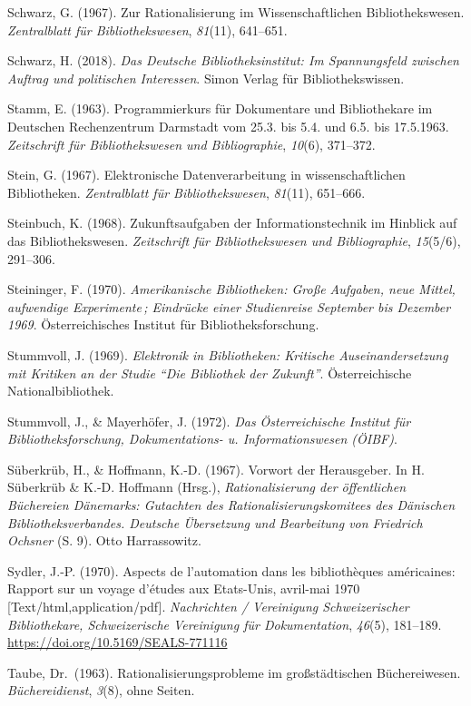 \documentclass[a4paper,
fontsize=11pt,
oneside,
numbers=noperiodatend,
parskip=half-,
bibliography=totoc,
final
]{scrartcl}
\begin{document}
Schwarz, G. (1967). Zur Rationalisierung im Wissenschaftlichen
Bibliothekswesen. \emph{Zentralblatt für Bibliothekswesen},
\emph{81}(11), 641--651.

Schwarz, H. (2018). \emph{Das Deutsche Bibliotheksinstitut: Im
Spannungsfeld zwischen Auftrag und politischen Interessen}. Simon Verlag
für Bibliothekswissen.

Stamm, E. (1963). Programmierkurs für Dokumentare und Bibliothekare im
Deutschen Rechenzentrum Darmstadt vom 25.3. bis 5.4. und 6.5. bis
17.5.1963. \emph{Zeitschrift für Bibliothekswesen und Bibliographie},
\emph{10}(6), 371--372.

Stein, G. (1967). Elektronische Datenverarbeitung in wissenschaftlichen
Bibliotheken. \emph{Zentralblatt für Bibliothekswesen}, \emph{81}(11),
651--666.

Steinbuch, K. (1968). Zukunftsaufgaben der Informationstechnik im
Hinblick auf das Bibliothekswesen. \emph{Zeitschrift für
Bibliothekswesen und Bibliographie}, \emph{15}(5/6), 291--306.

Steininger, F. (1970). \emph{Amerikanische Bibliotheken: Große Aufgaben,
neue Mittel, aufwendige Experimente\,; Eindrücke einer Studienreise
September bis Dezember 1969}. Österreichisches Institut für
Bibliotheksforschung.

Stummvoll, J. (1969). \emph{Elektronik in Bibliotheken: Kritische
Auseinandersetzung mit Kritiken an der Studie \enquote{Die Bibliothek der
Zukunft}}. Österreichische Nationalbibliothek.

Stummvoll, J., \& Mayerhöfer, J. (1972). \emph{Das Österreichische
Institut für Bibliotheksforschung, Dokumentations- u. Informationswesen
(ÖIBF)}.

Süberkrüb, H., \& Hoffmann, K.-D. (1967). Vorwort der Herausgeber. In H.
Süberkrüb \& K.-D. Hoffmann (Hrsg.), \emph{Rationalisierung der
öffentlichen Büchereien Dänemarks: Gutachten des
Rationalisierungskomitees des Dänischen Bibliotheksverbandes. Deutsche
Übersetzung und Bearbeitung von Friedrich Ochsner} (S. 9). Otto
Harrassowitz.

Sydler, J.-P. (1970). Aspects de l'automation dans les bibliothèques
américaines: Rapport sur un voyage d'études aux Etats-Unis, avril-mai
1970 {[}Text/html,application/pdf{]}. \emph{Nachrichten / Vereinigung
Schweizerischer Bibliothekare, Schweizerische Vereinigung für
Dokumentation}, \emph{46}(5), 181--189.
\url{https://doi.org/10.5169/SEALS-771116}

Taube, Dr.~(1963). Rationalisierungsprobleme im großstädtischen
Büchereiwesen. \emph{Büchereidienst}, \emph{3}(8), ohne Seiten.
\end{document}
